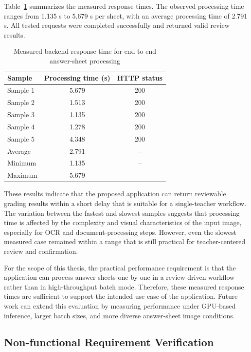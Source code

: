 \documentclass[../Main.tex]{subfiles}
\begin{document}
Table~\ref{table:processing_performance_results} summarizes the measured
response times. The observed processing time ranges from 1.135 s to 5.679 s per
sheet, with an average processing time of 2.791 s. All tested requests were
completed successfully and returned valid review results.

\begin{table}[H]
\centering
\caption{Measured backend response time for end-to-end answer-sheet processing}
\label{table:processing_performance_results}
\begin{tabular}{lcc}
\hline
\textbf{Sample} & \textbf{Processing time (s)} & \textbf{HTTP status} \\ \hline
Sample 1 & 5.679 & 200 \\
Sample 2 & 1.513 & 200 \\
Sample 3 & 1.135 & 200 \\
Sample 4 & 1.278 & 200 \\
Sample 5 & 4.348 & 200 \\ \hline
Average & 2.791 & -- \\
Minimum & 1.135 & -- \\
Maximum & 5.679 & -- \\ \hline
\end{tabular}
\end{table}

These results indicate that the proposed application can return reviewable
grading results within a short delay that is suitable for a single-teacher
workflow. The variation between the fastest and slowest samples suggests that
processing time is affected by the complexity and visual characteristics of the
input image, especially for OCR and document-processing steps. However, even the
slowest measured case remained within a range that is still practical for
teacher-centered review and confirmation.

For the scope of this thesis, the practical performance requirement is that the
application can process answer sheets one by one in a review-driven workflow
rather than in high-throughput batch mode. Therefore, these measured response
times are sufficient to support the intended use case of the application.
Future work can extend this evaluation by measuring performance under GPU-based
inference, larger batch sizes, and more diverse answer-sheet image conditions.

\subsection{Non-functional Requirement Verification}
\label{subsection:4.3.5}
\end{document}

